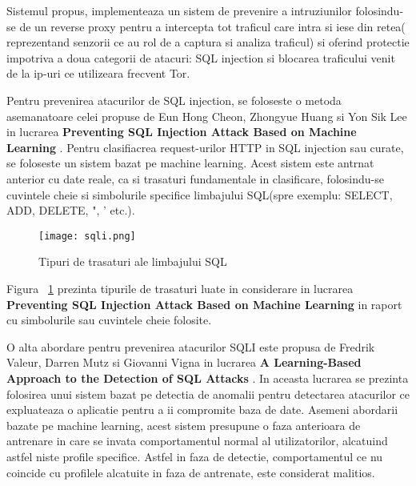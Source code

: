 Sistemul propus, \textit{\thesistitle} implementeaza un sistem de prevenire a intruziunilor folosindu-se de un reverse proxy pentru a intercepta tot traficul care intra si iese din retea( reprezentand senzorii ce au rol de a captura si analiza traficul) si oferind protectie impotriva a doua categorii de atacuri: SQL injection si blocarea traficului venit de la ip-uri ce utilizeara frecvent Tor.

Pentru prevenirea atacurilor de SQL injection, se foloseste o metoda asemanatoare celei propuse de Eun Hong Cheon, Zhongyue Huang si Yon Sik Lee in lucrarea \textbf{Preventing SQL Injection Attack Based on Machine Learning} \cite{sqli_how}. Pentru clasifiacrea request-urilor HTTP in SQL injection sau curate, se foloseste un sistem bazat pe machine learning. Acest sistem este antrnat anterior cu date reale, ca si trasaturi fundamentale in clasificare, folosindu-se cuvintele cheie si simbolurile specifice limbajului SQL(spre exemplu: SELECT, ADD, DELETE, ", ' etc.).

\begin{figure}[h]
\centering
\texttt{[image: sqli.png]}
\caption{Tipuri de trasaturi ale limbajului SQL}
\label{fig:sql-features}
\end{figure}

Figura ~\ref{fig:sql-features} prezinta tipurile de trasaturi luate in considerare in lucrarea \textbf{Preventing SQL Injection Attack Based on Machine Learning} in raport cu simbolurile sau cuvintele cheie folosite. 


O alta abordare pentru prevenirea atacurilor SQLI este propusa de Fredrik Valeur, Darren Mutz si Giovanni Vigna in lucrarea \textbf{A Learning-Based Approach to the Detection of SQL Attacks} \cite{sqli_how2}. In aceasta lucrarea se prezinta folosirea unui sistem bazat pe detectia de anomalii pentru detectarea atacurilor ce expluateaza o aplicatie pentru a ii compromite baza de date. Asemeni abordarii bazate pe machine learning, acest sistem presupune o faza anterioara de antrenare in care se invata comportamentul normal al utilizatorilor, alcatuind astfel niste profile specifice. Astfel in faza de detectie, comportamentul ce nu coincide cu profilele alcatuite in faza de antrenate, este considerat malitios.

